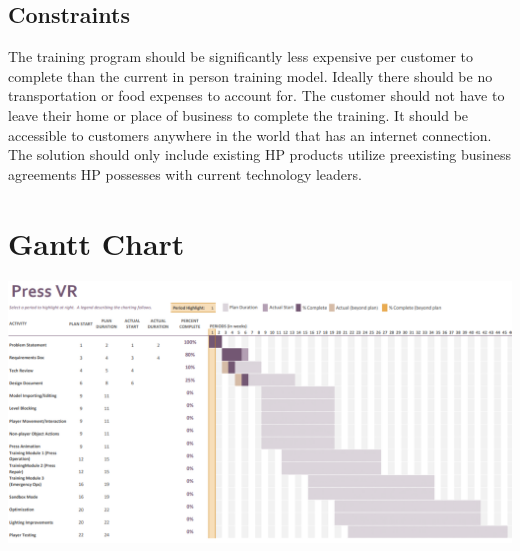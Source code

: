 \documentclass[onecolumn, draftclsnofoot,10pt, compsoc]{IEEEtran}
\begin{document}
\subsection{Constraints}
The training program should be significantly less expensive per customer to complete than the current in person training model. Ideally there should be no transportation or food expenses to account for. The customer should not have to leave their home or place of business to complete the training. It should be accessible to customers anywhere in the world that has an internet connection. The solution should only include existing HP products utilize preexisting business agreements HP possesses with current technology leaders. 

\section{Gantt Chart}
\bigskip
\includegraphics[scale=.75]{ganttChart.PNG}
\end{document}
